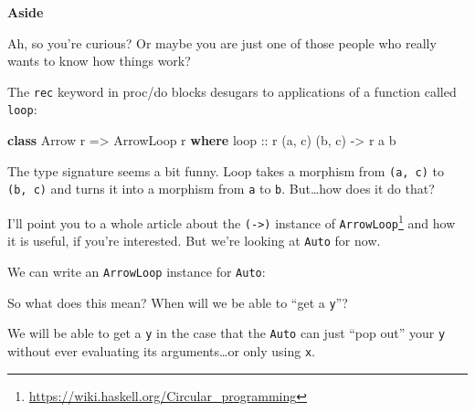 \documentclass[]{article}
\newenvironment{Shaded}{}{}
\newcommand{\CommentTok}[1]{\textcolor[rgb]{0.38,0.63,0.69}{\textit{#1}}}
\newcommand{\DataTypeTok}[1]{\textcolor[rgb]{0.56,0.13,0.00}{#1}}
\newcommand{\KeywordTok}[1]{\textcolor[rgb]{0.00,0.44,0.13}{\textbf{#1}}}
\newcommand{\NormalTok}[1]{#1}
\newcommand{\OperatorTok}[1]{\textcolor[rgb]{0.40,0.40,0.40}{#1}}
\newcommand{\OtherTok}[1]{\textcolor[rgb]{0.00,0.44,0.13}{#1}}
\renewcommand{\href}[2]{#2\footnote{\url{#1}}}
\begin{document}
\textbf{Aside}

Ah, so you're curious? Or maybe you are just one of those people who really
wants to know how things work?

The \texttt{rec} keyword in proc/do blocks desugars to applications of a
function called \texttt{loop}:

\begin{Shaded}
\begin{Highlighting}[]
\KeywordTok{class} \DataTypeTok{Arrow}\NormalTok{ r }\OtherTok{=\textgreater{}} \DataTypeTok{ArrowLoop}\NormalTok{ r }\KeywordTok{where}
\OtherTok{    loop ::}\NormalTok{ r (a, c) (b, c) }\OtherTok{{-}\textgreater{}}\NormalTok{ r a b}
\end{Highlighting}
\end{Shaded}

The type signature seems a bit funny. Loop takes a morphism from
\texttt{(a,\ c)} to \texttt{(b,\ c)} and turns it into a morphism from
\texttt{a} to \texttt{b}. But\ldots how does it do that?

I'll point you to \href{https://wiki.haskell.org/Circular_programming}{a whole
article about the \texttt{(-\textgreater{})} instance of \texttt{ArrowLoop}} and
how it is useful, if you're interested. But we're looking at \texttt{Auto} for
now.

We can write an \texttt{ArrowLoop} instance for \texttt{Auto}:

\begin{Shaded}
\end{Shaded}

So what does this mean? When will we be able to ``get a \texttt{y}''?

We will be able to get a \texttt{y} in the case that the \texttt{Auto} can just
``pop out'' your \texttt{y} without ever evaluating its arguments\ldots or only
using \texttt{x}.
\end{document}
